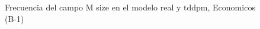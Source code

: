 \begin{figure}[H]
    \centering
    
    \caption{Frecuencia del campo M size en el modelo real y tddpm, Economicos (B-1)}
    \label{frecuency-M Size-tddpm_mlp}
\end{figure}